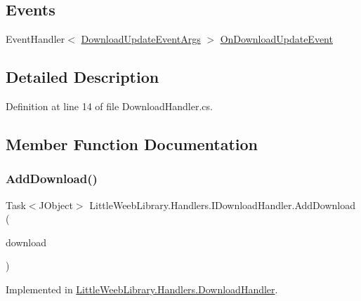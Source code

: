 \subsection*{Events}
\begin{DoxyCompactItemize}
\item 
Event\+Handler$<$ \mbox{\hyperlink{class_little_weeb_library_1_1_event_arguments_1_1_download_update_event_args}{Download\+Update\+Event\+Args}} $>$ \mbox{\hyperlink{interface_little_weeb_library_1_1_handlers_1_1_i_download_handler_ab1d80f17c3714758e3a605adddfe68ef}{On\+Download\+Update\+Event}}
\end{DoxyCompactItemize}


\subsection{Detailed Description}


Definition at line 14 of file Download\+Handler.\+cs.



\subsection{Member Function Documentation}
\mbox{\label{interface_little_weeb_library_1_1_handlers_1_1_i_download_handler_aa3c1ffac97fec47757494e14b5ade3d6}} 
\subsubsection{\texorpdfstring{Add\+Download()}{AddDownload()}}
{\footnotesize\ttfamily Task$<$J\+Object$>$ Little\+Weeb\+Library.\+Handlers.\+I\+Download\+Handler.\+Add\+Download (\begin{DoxyParamCaption}\item[{\mbox{\hyperlink{class_little_weeb_library_1_1_models_1_1_json_download_info}{Json\+Download\+Info}}}]{download }\end{DoxyParamCaption})}



Implemented in \mbox{\hyperlink{class_little_weeb_library_1_1_handlers_1_1_download_handler_ad28cb47c19cac5e761ceff86ea021a02}{Little\+Weeb\+Library.\+Handlers.\+Download\+Handler}}.


